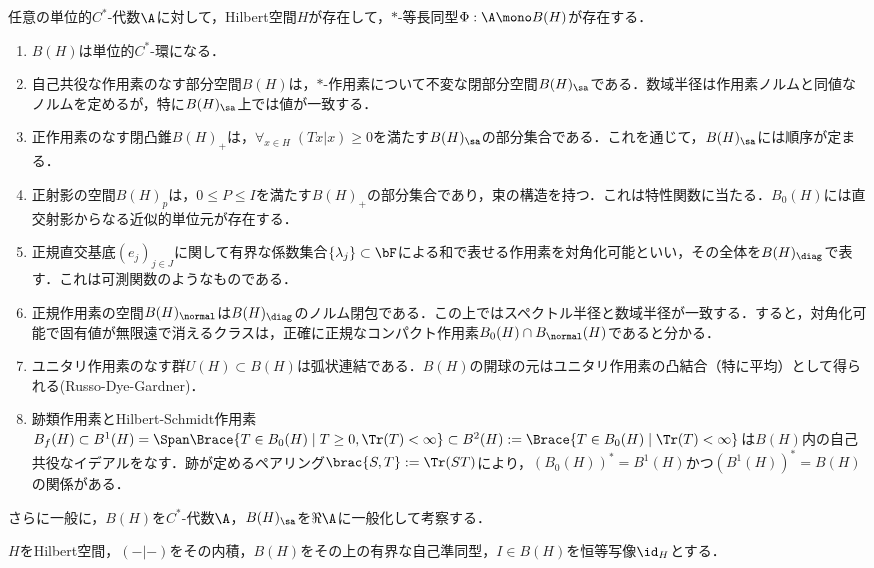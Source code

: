 \documentclass[uplatex,dvipdfmx]{jsreport}
\begin{document}
\begin{tcolorbox}[colframe=ForestGreen, colback=ForestGreen!10!white,breakable,colbacktitle=ForestGreen!40!white,coltitle=black,fonttitle=\bfseries\sffamily,
title=具体的$C^*$-環論は抽象的$C^*$-論と等価]
    任意の単位的$C^*$-代数$\A$に対して，Hilbert空間$H$が存在して，$*$-等長同型$\Phi:\A\mono B(H)$が存在する．
    \begin{enumerate}
        \item $B(H)$は単位的$C^*$-環になる．
        \item 自己共役な作用素のなす部分空間$B(H)$は，$*$-作用素について不変な閉部分空間$B(H)_\sa$である．数域半径は作用素ノルムと同値なノルムを定めるが，特に$B(H)_\sa$上では値が一致する．
        \item 正作用素のなす閉凸錐$B(H)_+$は，$\forall_{x\in H}\;(Tx|x)\ge0$を満たす$B(H)_\sa$の部分集合である．これを通じて，$B(H)_\sa$には順序が定まる．
        \item 正射影の空間$B(H)_p$は，$0\le P\le I$を満たす$B(H)_+$の部分集合であり，束の構造を持つ．これは特性関数に当たる．$B_0(H)$には直交射影からなる近似的単位元が存在する．
        \item 正規直交基底$(e_j)_{j\in J}$に関して有界な係数集合$\{\lambda_j\}\subset\bF$による和で表せる作用素を対角化可能といい，その全体を$B(H)_\diag$で表す．これは可測関数のようなものである．
        \item 正規作用素の空間$B(H)_\normal$は$B(H)_\diag$のノルム閉包である．この上ではスペクトル半径と数域半径が一致する．すると，対角化可能で固有値が無限遠で消えるクラスは，正確に正規なコンパクト作用素$B_0(H)\cap B_\normal(H)$であると分かる．
        \item ユニタリ作用素のなす群$U(H)\subset B(H)$は弧状連結である．$B(H)$の開球の元はユニタリ作用素の凸結合（特に平均）として得られる(Russo-Dye-Gardner)．
        \item 跡類作用素とHilbert-Schmidt作用素$B_f(H)\subset B^1(H)=\Span\Brace{T\in B_0(H)\mid T\ge0,\Tr(T)<\infty}\subset B^2(H):=\Brace{T\in B_0(H)\mid\Tr(T)<\infty}$は$B(H)$内の自己共役なイデアルをなす．跡が定めるペアリング$\brac{S,T}:=\Tr(ST)$により，$(B_0(H))^*=B^1(H)$かつ$(B^1(H))^*=B(H)$の関係がある．
    \end{enumerate}
    さらに一般に，$B(H)$を$C^*$-代数$\A$，$B(H)_\sa$を$\Re\A$に一般化して考察する．
\end{tcolorbox}

\begin{notation}
    $H$をHilbert空間，$(-|-)$をその内積，$B(H)$をその上の有界な自己準同型，$I\in B(H)$を恒等写像$\id_H$とする．
\end{notation}
\end{document}
